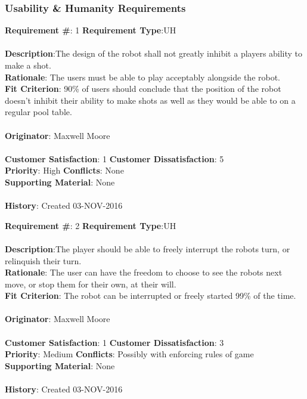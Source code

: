 \documentclass[titlepage]{article}
\begin{document}
\subsubsection{Usability \& Humanity Requirements}
\begin{framed}
	\noindent\textbf{Requirement \#}: 1 \hfill \textbf{Requirement Type}:UH \hfill\\\\
	\noindent\textbf{Description}:The design of the robot shall not greatly inhibit a players ability to make a shot.\\
	\textbf{Rationale}: The users must be able to play acceptably alongside the robot.\\
	\textbf{Fit Criterion}: 90\% of users should conclude that the position of the robot doesn't inhibit their ability to make shots as well as they would be able to on a regular pool table.\\\\
	\textbf{Originator}: Maxwell Moore\\\\
	\noindent\textbf{Customer Satisfaction}: 1 \hfill 	\textbf{Customer Dissatisfaction}: 5 \hfill\\
	\textbf{Priority}: High \hfill \textbf{Conflicts}: None \hfill\\
	\textbf{Supporting Material}: None\\\\
	\noindent\textbf{History}: Created 03-NOV-2016
\end{framed}

\begin{framed}
	\noindent\textbf{Requirement \#}: 2 \hfill \textbf{Requirement Type}:UH \hfill\\\\
	\noindent\textbf{Description}:The player should be able to freely interrupt the robots turn, or relinquish their turn.\\
	\textbf{Rationale}: The user can have the freedom to choose to see the robots next move, or stop them for their own, at their will.\\
	\textbf{Fit Criterion}: The robot can be interrupted or freely started 99\% of the time.\\\\
	\textbf{Originator}: Maxwell Moore\\\\
	\noindent\textbf{Customer Satisfaction}: 1 \hfill 	\textbf{Customer Dissatisfaction}: 3 \hfill\\
	\textbf{Priority}: Medium \hfill \textbf{Conflicts}: Possibly with enforcing rules of game \hfill\\
	\textbf{Supporting Material}: None\\\\
	\noindent\textbf{History}: Created 03-NOV-2016
\end{framed}
\end{document}
